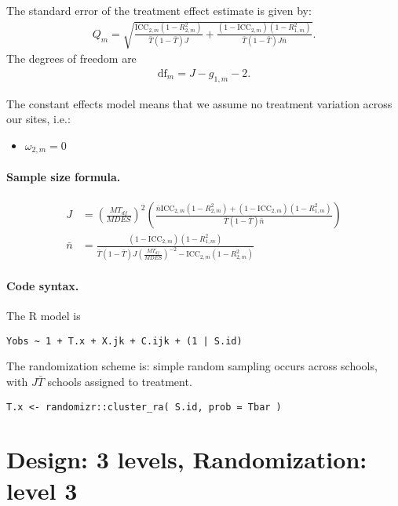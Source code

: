 \documentclass[12pt]{article}
\begin{document}
The standard error of the treatment effect estimate is given by:
\begin{align}
Q_m = \sqrt{\frac{\text{ICC}_{2,m}(1 - R^2_{2,m})}{\bar{T}(1 - \bar{T}) J} + \frac{(1-\text{ICC}_{2,m})(1-R^2_{1,m})}{\bar{T}(1 - \bar{T}) J \bar{n}}}.\end{align}
The degrees of freedom are
\begin{align}\text{df}_m = J - g_{1,m} - 2.\end{align}

The constant effects model means that we assume no treatment variation across our sites, i.e.:
\begin{itemize}
\item $\omega_{2,m} = 0$
\end{itemize}


\paragraph{Sample size formula.} 
\begin{align}
J &= \left(\frac{MT_{df}}{MDES}\right)^2 \left(\frac{ \bar{n} \text{ICC}_{2,m}(1-R^2_{2,m}) + (1-\text{ICC}_{2,m})(1-R^2_{1,m})}{\bar{T}(1 - \bar{T}) \bar{n}} \right)\\
\bar{n} &= \frac{(1-\text{ICC}_{2,m})(1-R^2_{1,m})}{\bar{T}(1 - \bar{T}) J \left(\frac{MT_{df}}{MDES}\right)^{-2} - \text{ICC}_{2,m}(1-R^2_{2,m})  }
\end{align}


\paragraph{Code syntax.}
The R model is
\begin{verbatim}
Yobs ~ 1 + T.x + X.jk + C.ijk + (1 | S.id)
\end{verbatim}

The randomization scheme is: simple random sampling occurs across schools, with $J\bar{T}$ schools assigned to treatment.
\begin{verbatim}
T.x <- randomizr::cluster_ra( S.id, prob = Tbar )
\end{verbatim}



\newpage 
\section{Design: 3 levels, Randomization: level 3}
\end{document}
